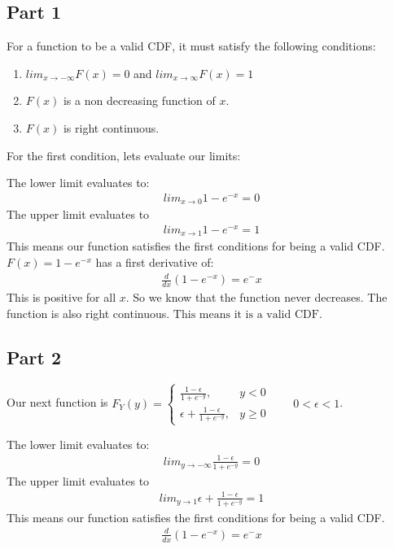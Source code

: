 \documentclass{article}
\begin{document}
\subsection*{Part 1}
For a function to be a valid CDF, it must satisfy the following conditions:
\begin{enumerate}
\item
$lim_{x\rightarrow -\infty} F(x) = 0$ and $lim_{x\rightarrow \infty} F(x) = 1$
\item
$F(x)$ is a non decreasing function of $x$.
\item
$F(x)$ is right continuous.
\end{enumerate}
For the first condition, lets evaluate our limits:

The lower limit evaluates to:
\begin{align*}
lim_{x\rightarrow 0} 1 - e^{-x} = 0
\end{align*}
The upper limit evaluates to
\begin{align*}
lim_{x\rightarrow 1} 1 - e^{-x} = 1
\end{align*}
This means our function satisfies the first conditions for being a valid CDF.
$F(x)=1-e^{-x}$ has a first derivative of:
\begin{align*}
\frac{d}{dx}(1-e^{-x})=e^-x
\end{align*}
This is positive for all $x$. So we know that the function never decreases. The function is also right continuous. $\boxed{\text{This means it is a valid CDF.}}$
\subsection*{Part 2}
Our next function is $F_Y(y) = \begin{cases} \frac{1-\epsilon}{1+e^{-y}}, & y<0 \\ \epsilon +\frac{1-\epsilon}{1+e^{-y}}, & y\geq 0\end{cases} \qquad 0<\epsilon < 1$.

The lower limit evaluates to:
\begin{align*}
lim_{y\rightarrow -\infty} \frac{1-\epsilon}{1+e^{-y}} = 0
\end{align*}
The upper limit evaluates to
\begin{align*}
lim_{y\rightarrow 1} \epsilon + \frac{1-\epsilon}{1+e^{-y}} = 1
\end{align*}
This means our function satisfies the first conditions for being a valid CDF.
\begin{align*}
\frac{d}{dx}(1-e^{-x})=e^-x
\end{align*}
\end{document}
